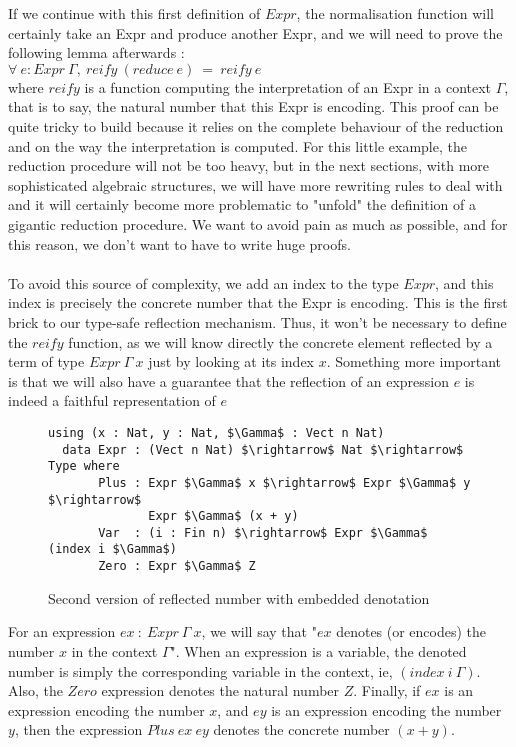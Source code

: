 If we continue with this first definition of $Expr$, the normalisation function will certainly take an Expr and produce another Expr, and we will need to prove the following lemma afterwards : \\
$\forall\ e:Expr\ \Gamma,\ reify\ (reduce\ e)\ =\ reify\ e$ \\
where $reify$ is a function computing the interpretation of an Expr in a context $\Gamma$, that is to say, the natural number that this Expr is encoding.
This proof can be quite tricky to build because it relies on the complete behaviour of the reduction and on the way the interpretation is computed.
For this little example, the reduction procedure will not be too heavy, but in the next sections, with more sophisticated algebraic structures, we will have more rewriting rules to deal with and it will certainly become more problematic to "unfold" the definition of a gigantic reduction procedure. We want to avoid pain as much as possible, and for this reason, we don't want to have to write huge proofs. \\
\\
To avoid this source of complexity, we add an index to the type $Expr$, and this index is precisely the concrete number that the Expr is encoding. This is the first brick to our type-safe reflection mechanism. Thus, it won't be necessary to define the $reify$ function, as we will know directly the concrete element reflected by a term of type $Expr\ \Gamma\ x$ just by looking at its index $x$. Something more important is that we will also have a guarantee that the reflection of an expression $e$ is indeed a faithful representation of $e$ \\

\begin{figure}[H]
\figrule
\begin{center}
\begin{lstlisting}
using (x : Nat, y : Nat, $\Gamma$ : Vect n Nat)
  data Expr : (Vect n Nat) $\rightarrow$ Nat $\rightarrow$ Type where
       Plus : Expr $\Gamma$ x $\rightarrow$ Expr $\Gamma$ y $\rightarrow$ 
              Expr $\Gamma$ (x + y)
       Var  : (i : Fin n) $\rightarrow$ Expr $\Gamma$ (index i $\Gamma$)
       Zero : Expr $\Gamma$ Z
\end{lstlisting}
\end{center}
\caption{Second version of reflected number with embedded denotation}
\figrule
\end{figure}

For an expression $ex\ :\ Expr\ \Gamma\ x$, we will say that "$ex$ denotes (or encodes) the number $x$ in the context $\Gamma$".
When an expression is a variable, the denoted number is simply the corresponding variable in the context, ie, $(index\ i\ \Gamma)$.
Also, the $Zero$ expression denotes the natural number $Z$.
Finally, if $ex$ is an expression encoding the number $x$, and $ey$ is an expression encoding the number $y$, then the expression $Plus\ ex\ ey$ denotes the concrete number $(x + y)$.


